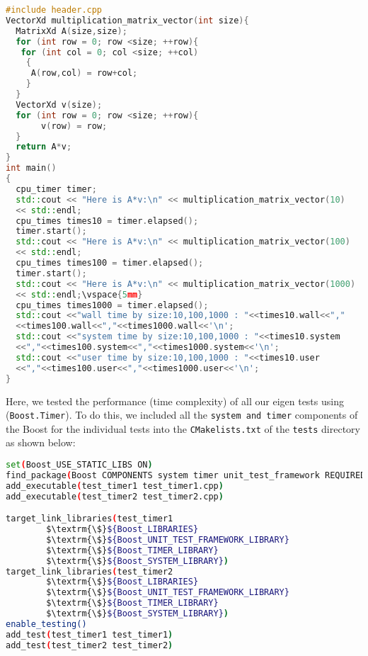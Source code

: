 \documentclass[11pt]{article}
\begin{document}
\begin{lstlisting}[language=c++]
#include header.cpp
VectorXd multiplication_matrix_vector(int size){
  MatrixXd A(size,size);
  for (int row = 0; row <size; ++row){
   for (int col = 0; col <size; ++col)
    {
     A(row,col) = row+col;
    }
  }
  VectorXd v(size);
  for (int row = 0; row <size; ++row){
       v(row) = row;
  }
  return A*v;
}
int main()
{
  cpu_timer timer;
  std::cout << "Here is A*v:\n" << multiplication_matrix_vector(10)
  << std::endl;
  cpu_times times10 = timer.elapsed();
  timer.start();
  std::cout << "Here is A*v:\n" << multiplication_matrix_vector(100)
  << std::endl;
  cpu_times times100 = timer.elapsed();
  timer.start();  
  std::cout << "Here is A*v:\n" << multiplication_matrix_vector(1000)
  << std::endl;\vspace{5mm}
  cpu_times times1000 = timer.elapsed();
  std::cout <<"wall time by size:10,100,1000 : "<<times10.wall<<","
  <<times100.wall<<","<<times1000.wall<<'\n';
  std::cout <<"system time by size:10,100,1000 : "<<times10.system
  <<","<<times100.system<<","<<times1000.system<<'\n';
  std::cout <<"user time by size:10,100,1000 : "<<times10.user
  <<","<<times100.user<<","<<times1000.user<<'\n'; 
}
\end{lstlisting}
\vspace{5mm}
Here, we tested the performance (time complexity)  of all our eigen tests using (\texttt{Boost.Timer}). To do this, we included all the \texttt{system and timer} components of the Boost for the individual tests into the \texttt{CMakelists.txt} of the  \texttt{tests} directory as shown below: 

\begin{lstlisting}[language={sh}]
set(Boost_USE_STATIC_LIBS ON)
find_package(Boost COMPONENTS system timer unit_test_framework REQUIRED)
add_executable(test_timer1 test_timer1.cpp)
add_executable(test_timer2 test_timer2.cpp)

target_link_libraries(test_timer1
        $\textrm{\$}${Boost_LIBRARIES}
        $\textrm{\$}${Boost_UNIT_TEST_FRAMEWORK_LIBRARY}
        $\textrm{\$}${Boost_TIMER_LIBRARY}
        $\textrm{\$}${Boost_SYSTEM_LIBRARY})
target_link_libraries(test_timer2
        $\textrm{\$}${Boost_LIBRARIES}
        $\textrm{\$}${Boost_UNIT_TEST_FRAMEWORK_LIBRARY}
        $\textrm{\$}${Boost_TIMER_LIBRARY}
        $\textrm{\$}${Boost_SYSTEM_LIBRARY})
enable_testing()
add_test(test_timer1 test_timer1)
add_test(test_timer2 test_timer2)
\end{lstlisting}
\end{document}
